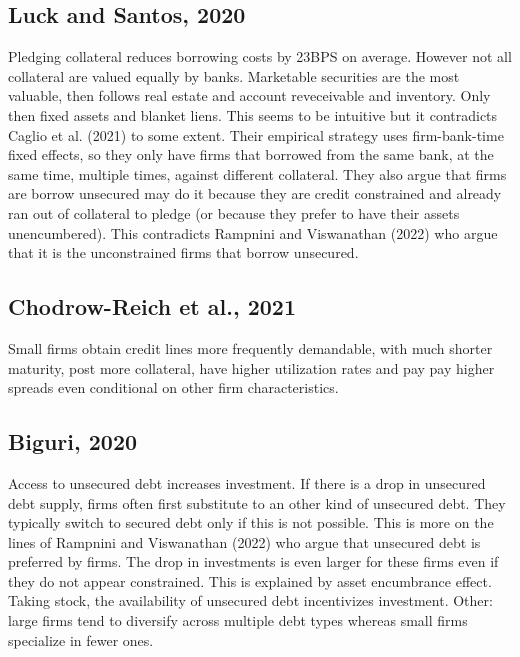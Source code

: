 \documentclass[12pt]{article}
\begin{document}
\subsection*{Luck and Santos, 2020}
Pledging collateral reduces borrowing costs by 23BPS on average. However not all collateral are valued equally by banks. Marketable securities are the most valuable, then follows real estate and account reveceivable and inventory. Only then fixed assets and blanket liens. This seems to be intuitive but it contradicts Caglio et al. (2021) to some extent. Their empirical strategy uses firm-bank-time fixed effects, so they only have firms that borrowed from the same bank, at the same time, multiple times, against different collateral.  They also argue that firms are borrow unsecured may do it because they are credit constrained and already ran out of collateral to pledge (or because they prefer to have their assets unencumbered). This contradicts Rampnini and Viswanathan (2022) who argue that it is the unconstrained firms that borrow unsecured. 

\subsection*{Chodrow-Reich et al., 2021}
Small firms obtain credit lines more frequently demandable, with much shorter maturity, post more collateral, have higher utilization rates and pay pay higher spreads even conditional on other firm characteristics. 

\subsection*{Biguri, 2020}
Access to unsecured debt increases investment. If there is a drop in unsecured debt supply, firms often first substitute to an other kind of unsecured debt. They typically switch to secured debt only if this is not possible. This is more on the lines of Rampnini and Viswanathan (2022) who argue that unsecured debt is preferred by firms. The drop in investments is even larger for these firms even if they do not appear constrained. This is explained by asset encumbrance effect. Taking stock, the availability of unsecured debt incentivizes investment. Other: large firms tend to diversify  across multiple debt types whereas small firms specialize in fewer ones. 
\end{document}
